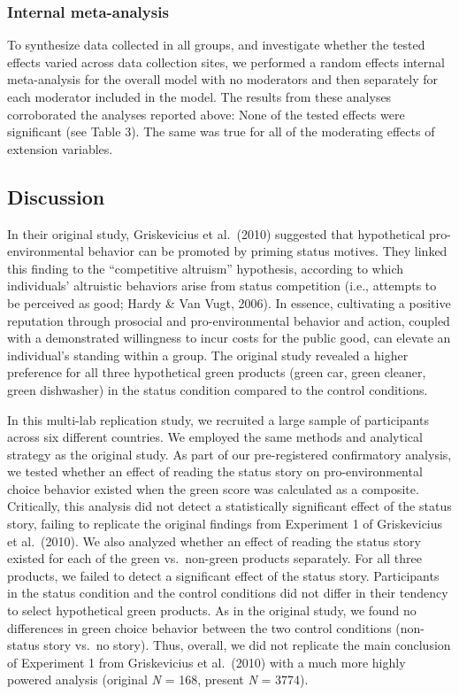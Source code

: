 \documentclass[
]{article}
\begin{document}
\subsubsection{Internal meta-analysis}\label{internal-meta-analysis}

To synthesize data collected in all groups, and investigate whether the
tested effects varied across data collection sites, we performed a
random effects internal meta-analysis for the overall model with no
moderators and then separately for each moderator included in the model.
The results from these analyses corroborated the analyses reported
above: None of the tested effects were significant (see Table 3). The
same was true for all of the moderating effects of extension variables.

\subsection{Discussion}\label{discussion}

In their original study, Griskevicius et al.~(2010) suggested that
hypothetical pro-environmental behavior can be promoted by priming
status motives. They linked this finding to the ``competitive altruism''
hypothesis, according to which individuals' altruistic behaviors arise
from status competition (i.e., attempts to be perceived as good; Hardy
\& Van Vugt, 2006). In essence, cultivating a positive reputation
through prosocial and pro-environmental behavior and action, coupled
with a demonstrated willingness to incur costs for the public good, can
elevate an individual's standing within a group. The original study
revealed a higher preference for all three hypothetical green products
(green car, green cleaner, green dishwasher) in the status condition
compared to the control conditions.

In this multi-lab replication study, we recruited a large sample of
participants across six different countries. We employed the same
methods and analytical strategy as the original study. As part of our
pre-registered confirmatory analysis, we tested whether an effect of
reading the status story on pro-environmental choice behavior existed
when the green score was calculated as a composite. Critically, this
analysis did not detect a statistically significant effect of the status
story, failing to replicate the original findings from Experiment 1 of
Griskevicius et al.~(2010). We also analyzed whether an effect of
reading the status story existed for each of the green vs.~non-green
products separately. For all three products, we failed to detect a
significant effect of the status story. Participants in the status
condition and the control conditions did not differ in their tendency to
select hypothetical green products. As in the original study, we found
no differences in green choice behavior between the two control
conditions (non-status story vs.~no story). Thus, overall, we did not
replicate the main conclusion of Experiment 1 from Griskevicius et
al.~(2010) with a much more highly powered analysis (original \emph{N} =
168, present \emph{N} = 3774).
\end{document}
